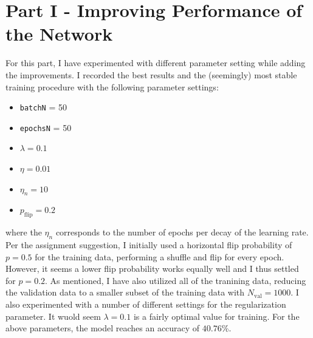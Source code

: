 \documentclass{article}
\begin{document}
\section*{Part I - Improving Performance of the Network}
	For this part, I have experimented with different parameter setting while adding the improvements. I recorded the best results and the (seemingly) most stable training procedure with the following parameter settings:
	\begin{itemize}
		\item \texttt{batchN} = 50
		\item \texttt{epochsN} = 50
		\item $\lambda = 0.1$
		\item $\eta = 0.01$
		\item $\eta_n = 10$
		\item $p_{\text{flip}} = 0.2$
	\end{itemize}
	where the $\eta_n$ corresponds to the number of epochs per decay of the learning rate. Per the assignment suggestion, I initially used a horizontal flip probability of $p = 0.5$ for the training data, performing a shuffle and flip for every epoch. However, it seems a lower flip probability works equally well and I thus settled for $p = 0.2$. As mentioned, I have also utilized all of the tranining data, reducing the validation data to a smaller subset of the training data with $N_{\text{val}} = 1000$. I also experimented with a number of different settings for the regularization parameter. It wuold seem $\lambda = 0.1$ is a fairly optimal value for training. For the above parameters, the model reaches an accuracy of $40.76$\%.
\end{document}
